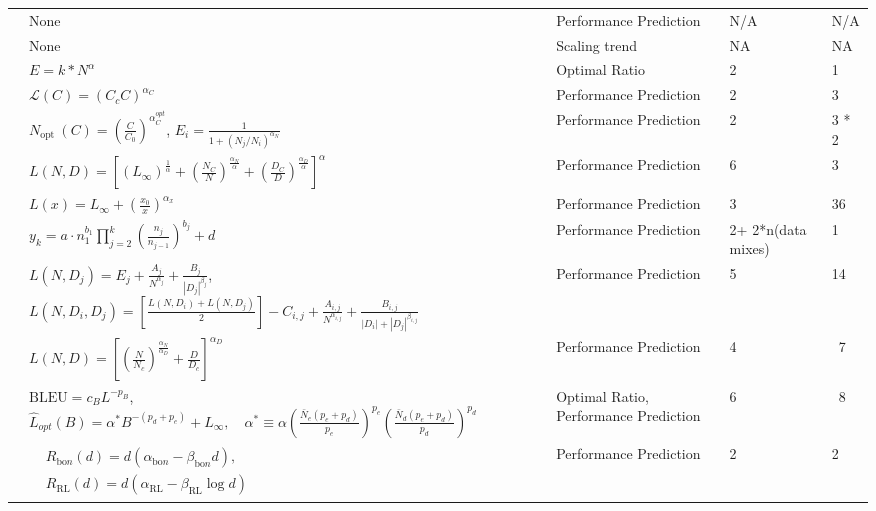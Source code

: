 \begin{table}[]
{\begin{tabular}{lllll}
\cite{rae2021scaling} & None & Performance Prediction & N/A & N/A \\
\cite{shin2023scaling} & None & Scaling trend & NA & NA \\
\cite{hernandez2022scaling} & $E=k * N^\alpha$ & Optimal Ratio & 2 & 1 \\
\cite{filipovich2022scaling} & $\mathcal{L}(C)=\left(C_c C\right)^{\alpha_C}$ & Performance Prediction & 2 & 3 \\
\cite{neumann2022scaling} & $N_{\text {opt }}(C)=\left(\frac{C}{C_0}\right)^{\alpha_C^{o p t}}$, $E_i=\frac{1}{1+\left(N_j / N_i\right)^{\alpha_N}}$ & Performance Prediction & 2 & 3 * 2 \\
\cite{droppo2021scaling} & $L(N, D)=\left[\left(L_{\infty}\right)^{\frac{1}{\alpha}}+\left(\frac{N_C}{N}\right)^{\frac{\alpha_N}{\alpha}}+\left(\frac{D_C}{D}\right)^{\frac{\alpha_D}{\alpha}}\right]^\alpha$ & Performance Prediction & 6 & 3 \\
\cite{henighan2020scaling} & $L(x)=L_{\infty}+\left(\frac{x_0}{x}\right)^{\alpha_x}$ & Performance Prediction & 3 & 36 \\
\cite{goyal2024scaling} & $y_k=a \cdot n_1^{b_1} \prod_{j=2}^k\left(\frac{n_j}{n_{j-1}}\right)^{b_j}+d$ & Performance Prediction & 2+ 2*n(data mixes) & 1 \\
\cite{aghajanyan2023scaling} & $L(N, D_j)=E_j + \frac{A_j}{N^{\alpha_j}} + \frac{B_j}{|D_j|^{\beta_j}}$, $L(N, D_i, D_j) = [\frac{L(N, D_i) + L(N, D_j)}{2}] - C_{i,j} + \frac{A_{i,j}}{N^{\alpha_{i,j}}} + \frac{B_{i,j}}{|D_i|+|D_j|^{\beta_{i,j}}}$ & Performance Prediction & 5 & 14 \\
\cite{kaplan2020scaling} & $L(N, D) = \left[ \left( \frac{N}{N_c}\right)^{\frac{\alpha_N}{\alpha_D}} + \frac{D}{D_c} \right]^{\alpha_D}$     & Performance Prediction & 4 & ~7 \\
\cite{ghorbani2021scaling} & $\mathrm{BLEU}=c_B L^{-p_B}$, $\hat{L}_{o p t}(B)=\alpha^* B^{-\left(p_d+p_e\right)}+L_{\infty}, \quad \alpha^* \equiv \alpha\left(\frac{\bar{N}_e\left(p_e+p_d\right)}{p_e}\right)^{p_e}\left(\frac{\bar{N}_d\left(p_e+p_d\right)}{p_d}\right)^{p_d}$ & Optimal Ratio, Performance Prediction & 6 & ~8 \\
\cite{gao2023scaling} & $\begin{aligned} & R_{\mathrm{bo} n}(d)=d\left(\alpha_{\mathrm{bo} n}-\beta_{\mathrm{bo} n} d\right), \\ & R_{\mathrm{RL}}(d)=d\left(\alpha_{\mathrm{RL}}-\beta_{\mathrm{RL}} \log d\right)\end{aligned}$ & Performance Prediction & 2 & 2 \\

\end{tabular}}
\end{table}
